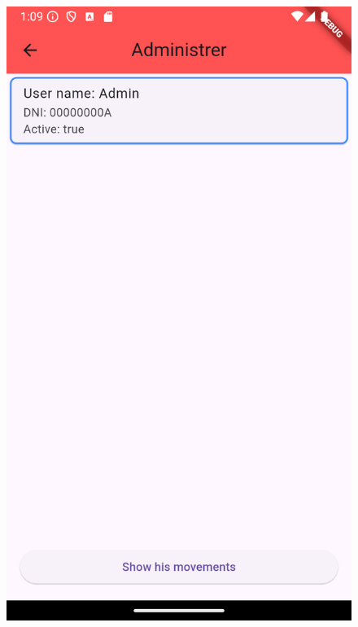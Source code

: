 \documentclass[a4paper,12pt,twoside]{ThesisStyle}
\begin{document}
\begin{figure}[h]
\begin{minipage}{0.31\textwidth}
        \includegraphics[width=\linewidth]{imatges/showAdminMovement.png}
    \end{minipage}
    \begin{minipage}{0.31\textwidth}

\end{minipage}
\end{figure}
\end{document}
